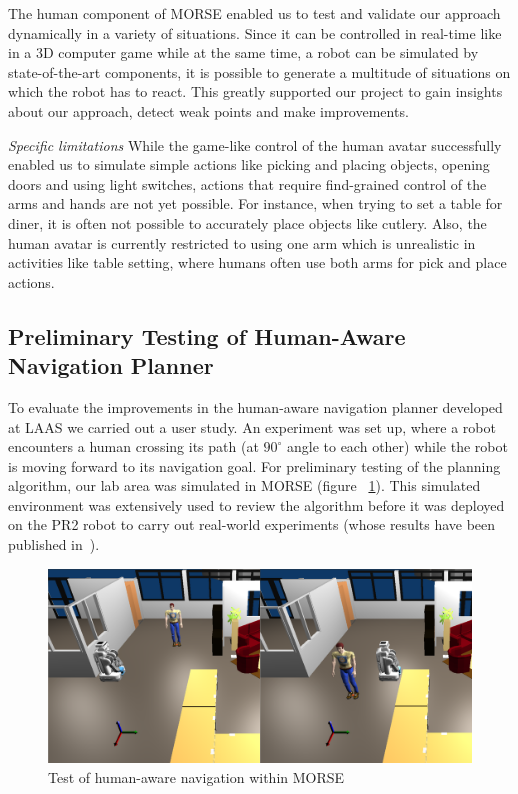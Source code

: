 \documentclass[letterpaper, 10pt, conference]{ieeeconf}
\begin{document}
The human component of MORSE enabled us to test and validate our approach
dynamically in a variety of situations. Since it can be controlled in real-time
like in a 3D computer game while at the same time, a robot can be simulated by
state-of-the-art components, it is possible to generate a multitude of
situations on which the robot has to react. This greatly supported our project
to gain insights about our approach, detect weak points and make improvements.

\emph{Specific limitations} While the game-like control of the human avatar 
successfully enabled us to simulate simple actions like picking and placing objects, 
opening doors and using light switches, actions that require find-grained control 
of the arms and hands are not yet possible. For instance, when trying to set a table for 
diner, it is often not possible to accurately place objects like cutlery. Also, the human
avatar is currently restricted to using one arm which is unrealistic in activities 
like table setting, where humans often use both arms for pick and place actions.
 

\subsection{Preliminary Testing of Human-Aware Navigation Planner}
\label{sc:navigation}

To evaluate the improvements in the human-aware navigation planner developed at
LAAS we carried out a user study. An experiment was set up,
where a robot encounters a human crossing its path (at $90^{\circ }$ angle to
each other) while the robot is moving forward to its navigation goal. For
preliminary testing of the planning algorithm, our lab area was simulated in
MORSE (figure ~\ref{fig|hanp}). This simulated environment was extensively used
to review the algorithm before it was deployed on the PR2 robot to carry out
real-world experiments (whose results have been published
in~\cite{ThibaultKruse2014}).

\begin{figure}[H]
      \centering
      \includegraphics[width=0.9\linewidth]{morsehanp.png}
      \caption{Test of human-aware navigation within MORSE}
      \label{fig|hanp}
\end{figure}
\end{document}
